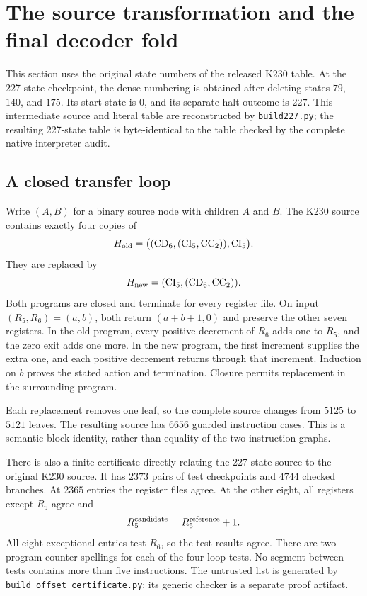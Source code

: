 \section{The source transformation and the final decoder fold}
\label{sec:k227-source-roles}

This section uses the original state numbers of the released K230 table.
At the 227-state checkpoint, the dense numbering is obtained after deleting states
$79$, $140$, and $175$.  Its start state is $0$, and its separate halt
outcome is $227$.  This intermediate source and literal table are reconstructed by
\texttt{build227.py}; the resulting 227-state table is byte-identical to the table checked
by the complete native interpreter audit.

\subsection{A closed transfer loop}

Write $(A,B)$ for a binary source node with children $A$ and $B$.
The K230 source contains exactly four copies of
\[
 H_{\rm old}
 =\bigl((\mathrm{CD}_6,(\mathrm{CI}_5,\mathrm{CC}_2)),
          \mathrm{CI}_5\bigr).
\]
They are replaced by
\[
 H_{\rm new}=(\mathrm{CI}_5,(\mathrm{CD}_6,\mathrm{CC}_2)).
\]
Both programs are closed and terminate for every register file.  On input
$(R_5,R_6)=(a,b)$, both return $(a+b+1,0)$ and preserve the other seven
registers.  In the old program, every positive decrement of $R_6$ adds one
to $R_5$, and the zero exit adds one more.  In the new program, the first
increment supplies the extra one, and each positive decrement returns
through that increment.  Induction on $b$ proves the stated action and
termination.  Closure permits replacement in the surrounding program.

Each replacement removes one leaf, so the complete source changes from
$5125$ to $5121$ leaves.  The resulting source has $6656$ guarded
instruction cases.  This is a semantic block identity, rather than
equality of the two instruction graphs.

There is also a finite certificate directly relating the 227-state source to
the original K230 source.  It has $2373$ pairs of test checkpoints and
$4744$ checked branches.  At $2365$ entries the register files agree.
At the other eight, all registers except $R_5$ agree and
\[
 R^{\rm candidate}_5=R^{\rm reference}_5+1.
\]
All eight exceptional entries test $R_6$, so the test results agree.
There are two program-counter spellings for each of the four loop tests.
No segment between tests contains more than five instructions.  The
untrusted list is generated by \texttt{build\_offset\_certificate.py};
its generic checker is a separate proof artifact.

